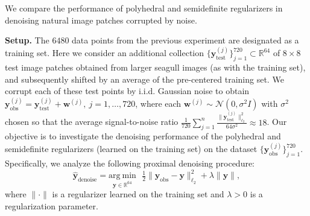 \documentclass[11pt,letterpaper]{article}
\newcommand{\R}{\mathbb{R}}
\newcommand{\by}{\mathbf{y}}
\newcommand{\argmin}{\mathrm{arg~min}}
\newcommand{\bw}{\mathbf{w}}
\begin{document}
We compare the performance of polyhedral and semidefinite regularizers in denoising natural image patches corrupted by noise.

\textbf{Setup.} The $6480$ data points from the previous experiment are designated as a training set.  Here we consider an additional collection $\{\by^{(j)}_{\mathrm{test}}\}_{j=1}^{720} \subset \R^{64}$ of $8 \times 8$ test image patches obtained from larger seagull images (as with the training set), and subsequently shifted by an average of the pre-centered training set.  We corrupt each of these test points by i.i.d. Gaussian noise to obtain $\by^{(j)}_{\mathrm{obs}} = \by^{(j)}_{\mathrm{test}} + \bw^{(j)}, ~ j=1,\dots,720$, where each $\bw^{(j)} \sim \mathcal{N}(0, \sigma^2 I)$ with $\sigma^2$ chosen so that the average signal-to-noise ratio $\frac{1}{720} \sum_{j=1}^n \frac{\|\by^{(j)}_{\mathrm{test}}\|_{\ell_2}^2}{64 \sigma^2} \approx 18$.  Our objective is to investigate the denoising performance of the polyhedral and semidefinite regularizers (learned on the training set) on the dataset $\{\by^{(j)}_{\mathrm{obs}}\}_{j=1}^{720}$.  Specifically, we analyze the following proximal denoising procedure:
\begin{equation} \label{eq:proxoperator}
\hat{\by}_{\mathrm{denoise}} = \underset{\by \in \R^{64}}{\argmin} ~~~ \tfrac{1}{2} \|\by_{\mathrm{obs}} - \by\|_{\ell_2}^2 + \lambda \|\by\|,
\end{equation}
where $\|\cdot\|$ is a regularizer learned on the training set and $\lambda > 0$ is a regularization parameter.
\end{document}
